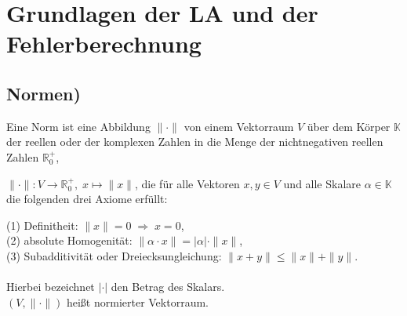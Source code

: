 \section{Grundlagen der LA und der Fehlerberechnung}

\subsection{Normen)}

Eine Norm ist eine Abbildung $ \|\cdot \|$ von einem Vektorraum $ V$ über dem Körper $  \mathbb {K} $  der reellen oder der komplexen Zahlen in die Menge der nichtnegativen reellen Zahlen $  {\mathbb {R} }_{0}^{+} $,

$  \|\cdot \|\colon V\to {\mathbb {R} }_{0}^{+},\;x\mapsto \|x\| $,
die für alle Vektoren $  x,y\in V $ und alle Skalare $  \alpha \in \mathbb {K} $  die folgenden drei Axiome erfüllt:

(1) Definitheit:	$  \|x\|=0\;\Rightarrow \;x=0 $,\\
(2) absolute Homogenität:	$  \|\alpha \cdot x\|=|\alpha |\cdot \|x\| $,\\
(3) Subadditivität oder Dreiecksungleichung:	$ \|x+y\|\leq \|x\|+\|y\| $.\\
\\
Hierbei bezeichnet  $|\cdot |$ den Betrag des Skalars.\\
$(V,\|\cdot \|)$ heißt normierter Vektorraum.